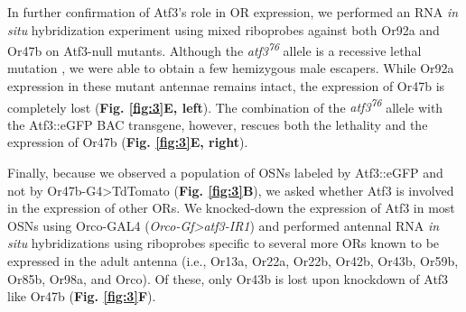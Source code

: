 In further confirmation of Atf3's role in OR expression, we performed an RNA \emph{in situ} hybridization experiment using mixed riboprobes against both Or92a and Or47b on Atf3-null mutants.
Although the \emph{atf3\textsuperscript{76}} allele is a recessive lethal mutation \cite{Brodesser_Jindra_Uhlirova_2012}, we were able to obtain a few hemizygous male escapers.
While Or92a expression in these mutant antennae remains intact, the expression of Or47b is completely lost (\textbf{Fig. \ref{fig:3}E, left}).
The combination of the \emph{atf3\textsuperscript{76}} allele with the Atf3::eGFP BAC transgene, however, rescues both the lethality and the expression of Or47b (\textbf{Fig. \ref{fig:3}E, right}).

Finally, because we observed a population of OSNs labeled by Atf3::eGFP and not by Or47b-G4>TdTomato (\textbf{Fig. \ref{fig:3}B}), we asked whether Atf3 is involved in the expression of other ORs.
We knocked-down the expression of Atf3 in most OSNs using Orco-GAL4 (\emph{Orco-Gf>atf3-IR1}) and performed antennal RNA \emph{in situ} hybridizations using riboprobes specific to several more ORs known to be expressed in the adult antenna (i.e., Or13a, Or22a, Or22b, Or42b, Or43b, Or59b, Or85b, Or98a, and Orco).
Of these, only Or43b is lost upon knockdown of Atf3 like Or47b (\textbf{Fig. \ref{fig:3}F}).
